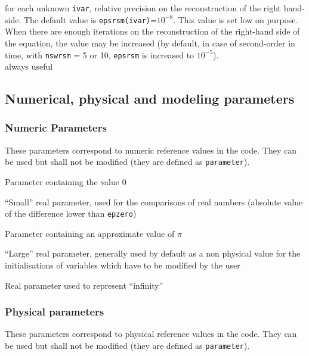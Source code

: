 {for each unknown {\tt ivar}, relative precision on the reconstruction of the
right hand-side. The default value is {\tt epsrsm(ivar)}=$10^{-8}$. This value is set low
on purpose. When there are enough iterations on the reconstruction of the
right-hand side of the equation,
the value may be increased (by default, in case of second-order in time,
with {\tt nswrsm} = 5 or 10, {\tt epsrsm} is increased to $10^{-5}$).\\
always useful}


\subsection{Numerical, physical and modeling parameters}
\subsubsection{Numeric Parameters}

These parameters correspond to numeric reference values in the code.
They can be used but shall not be modified (they are defined as \texttt{parameter}).

{Parameter containing the value 0}

{``Small'' real parameter, used for the comparisons of real numbers (absolute
value of the difference lower than {\tt epzero})}

{Parameter containing an approximate value of $\pi$}

{``Large'' real parameter, generally used by default as a non physical value for
the initialisations of variables which have to be modified by the user}

{Real parameter used to represent ``infinity''}

\subsubsection{Physical parameters}
These parameters correspond to physical reference values in the code.
They can be used but shall not be modified (they are defined as {\tt parameter}).

